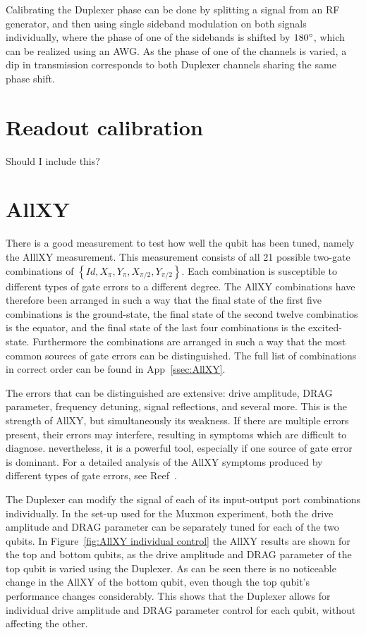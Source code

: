       Calibrating the Duplexer phase can be done by splitting a signal from an RF generator, and then using single sideband modulation on both signals individually, where the phase of one of the sidebands is shifted by $180 \degree$, which can be realized using an AWG. As the phase of one of the channels is varied, a dip in transmission corresponds to both Duplexer channels sharing the same phase shift.

    \section{Readout calibration}
      \label{sec:Readout calibration}
      Should I include this?

    \section{AllXY}
      \label{sec:AllXY}
        There is a good measurement to test how well the qubit has been tuned, namely the AlllXY measurement. This measurement consists of all 21 possible two-gate combinations of $\left\{Id, X_{\pi}, Y_{\pi}, X_{\pi/2}, Y_{\pi/2}\right\}$. Each combination is susceptible to different types of gate errors to a different degree. The AllXY combinations have therefore been arranged in such a way that the final state of the first five combinations is the ground-state, the final state of the second twelve combinatios is the equator, and the final state of the last four combinations is the excited-state. Furthermore the combinations are arranged in such a way that the most common sources of gate errors can be distinguished. The full list of combinations in correct order can be found in App~\ref{ssec:AllXY}.

        The errors that can be distinguished are extensive: drive amplitude, DRAG parameter, frequency detuning, signal reflections, and several more. This is the strength of AllXY, but simultaneously its weakness. If there are multiple errors present, their errors may interfere, resulting in symptoms which are difficult to diagnose. nevertheless, it is a powerful tool, especially if one source of gate error is dominant. For a detailed analysis of the AllXY symptoms produced by different types of gate errors, see Reef~\cite{Reed}.

      The Duplexer can modify the signal of each of its input-output port combinations individually. In the set-up used for the Muxmon experiment, both the drive amplitude and DRAG parameter can be separately tuned for each of the two qubits. In Figure~\ref{fig:AllXY individual control} the AllXY results are shown for the top and bottom qubits, as the drive amplitude and DRAG parameter of the top qubit is varied using the Duplexer. As can be seen there is no noticeable change in the AllXY of the bottom qubit, even though the top qubit's performance changes considerably. This shows that the Duplexer allows for individual drive amplitude and DRAG parameter control for each qubit, without affecting the other.

